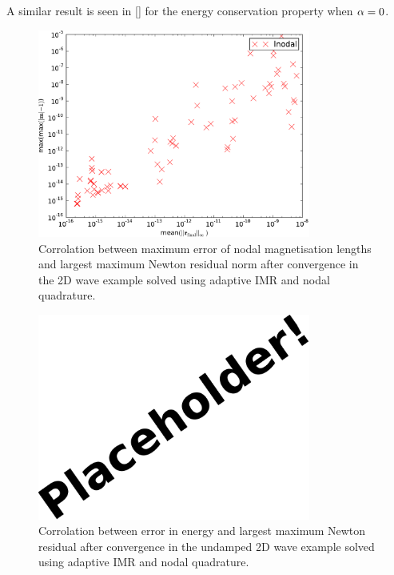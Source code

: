 A similar result is seen in \cref{} for the energy conservation property when $\alpha = 0$.

\begin{figure}
  \centering
  \includegraphics[width=0.8\textwidth]
  {plots/2d_wave_solution_m_length_newton_res/-maxmaxmathbfm-1vsmeanmathbfr_mathrmfinal_infty.pdf}
  \caption{Corrolation between maximum error of nodal magnetisation lengths and largest maximum Newton residual norm after convergence in the 2D wave example solved using adaptive IMR and nodal quadrature.}
  \label{fig:ml-error-2d-nodal-newton-tests}
\end{figure}


\begin{figure}
  \centering
  \includegraphics[width=0.8\textwidth] {images/placeholder}
  \caption{Corrolation between error in energy and largest maximum Newton residual after convergence in the undamped 2D wave example solved using adaptive IMR and nodal quadrature.}
  \label{fig:energy-error-2d-nodal-newton-tests}
\end{figure}



